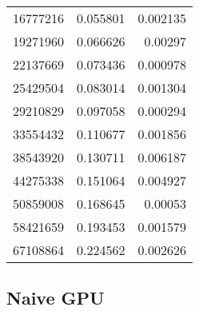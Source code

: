 \begin{longtable}{r r r}
16777216 & 0.055801 & 0.002135 \\
19271960 & 0.066626 & 0.00297 \\
22137669 & 0.073436 & 0.000978 \\
25429504 & 0.083014 & 0.001304 \\
29210829 & 0.097058 & 0.000294 \\
33554432 & 0.110677 & 0.001856 \\
38543920 & 0.130711 & 0.006187 \\
44275338 & 0.151064 & 0.004927 \\
50859008 & 0.168645 & 0.00053 \\
58421659 & 0.193453 & 0.001579 \\
67108864 & 0.224562 & 0.002626 \\
\end{longtable}

\subsection*{Naive GPU}

